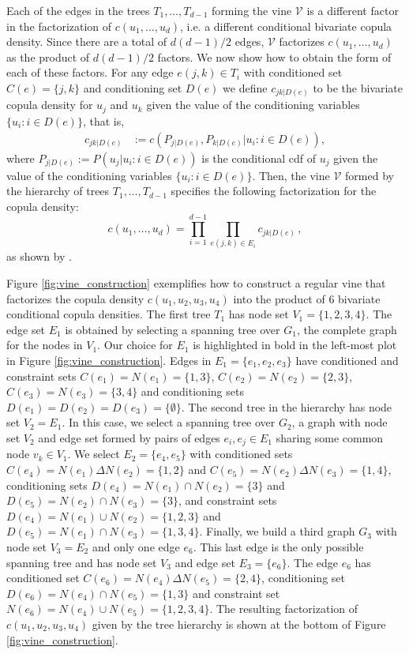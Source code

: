 \documentclass{article}
\begin{document}
Each of the edges in the trees $T_1,\ldots,T_{d-1}$ forming the vine
$\mathcal{V}$ is a different factor in the factorization of
$c(u_1,\ldots,u_d)$, i.e. a different conditional bivariate copula density.
Since there are a total of $d(d-1)/2$ edges, $\mathcal{V}$ factorizes
$c(u_1,\ldots,u_d)$ as the product of $d(d-1)/2$ factors. We now show how to
obtain the form of each of these factors.  For any edge $e(j,k) \in T_i$ with
conditioned set $C(e)=\{j,k\}$ and conditioning set $D(e)$ we define
$c_{jk|D(e)}$ to be the bivariate copula density for $u_j$ and $u_k$ given the
value of the conditioning variables $\{u_i: i \in D(e) \}$, that is,
\begin{align} c_{jk|D(e)} & := c( P_{j|D(e)}, P_{k|D(e)}| u_i : i \in
D(e)),\label{eq:defcjk} \end{align} where $P_{j|D(e)}:=P(u_j|u_i : i \in D(e))$
is the conditional cdf of $u_j$ given the value of the conditioning variables
$\{u_i: i \in D(e) \}$.  Then, the vine $\mathcal{V}$ formed by the hierarchy
of trees $T_1,\ldots,T_{d-1}$ specifies the following factorization for the
copula density:
\begin{equation}
c(u_1, \ldots, u_d) = \prod_{i=1}^{d-1} \prod_{e(j,k) \in E_i}
c_{jk|D(e)}\,,\label{eq:vindeDecomposition}
\end{equation}
as shown by \citet{Kurowicka2006}. 

Figure \ref{fig:vine_construction} exemplifies how to construct a regular vine that
factorizes the copula density $c(u_1, u_2, u_3, u_4)$ into the product of 6
bivariate conditional copula densities.  The first tree $T_1$ has node set $V_1
= \{ 1,2,3,4 \}$.  The edge set $E_1$ is obtained by selecting a spanning tree
over $G_1$, the complete graph for the nodes in $V_1$.  Our choice for $E_1$ is
highlighted in bold in the left-most plot in Figure
\ref{fig:vine_construction}.  Edges in $E_1 = \{ e_1, e_2, e_3
\}$ have conditioned and constraint sets $C(e_1) = N(e_1) = \{ 1, 3 \}$,
$C(e_2) = N(e_2) = \{2,3\}$, $C(e_3) = N(e_3) = \{3,4\}$ and conditioning sets
$D(e_1) = D(e_2) = D(e_3) = \{ \emptyset \}$.  The second tree in the hierarchy
has node set $V_2 = E_1$.  In this case, we select a spanning tree over $G_2$,
a graph with node set $V_2$ and edge set formed by pairs of edges $e_i, e_j \in
E_1$ sharing some common node $v_k \in V_1$.  We select $E_2 = \{ e_4, e_5 \}$
with conditioned sets $C(e_4) = N(e_1) \Delta N(e_2) = \{1,2\}$ and $C(e_5) =
N(e_2) \Delta N(e_3) = \{1,4\}$, conditioning sets $D(e_4) = N(e_1) \cap N(e_2)
= \{ 3 \}$ and $D(e_5) = N(e_2) \cap N(e_3) = \{3\}$, and constraint sets
$D(e_4) = N(e_1) \cup N(e_2) = \{ 1, 2, 3 \}$ and $D(e_5) = N(e_1) \cap N(e_3)
= \{ 1, 3, 4 \}$.  Finally, we build a third graph $G_3$ with node set $V_3 =
E_2$ and only one edge $e_6$. This last edge is the only possible spanning tree
and has node set $V_3$ and edge set $E_3=\{e_6\}$.  The edge $e_6$ has
conditioned set $C(e_6) = N(e_4) \Delta N(e_5) = \{2,4\}$, conditioning set
$D(e_6) = N(e_4) \cap N(e_5) = \{1,3\}$ and constraint set $N(e_6) = N(e_4)
\cup N(e_5) = \{ 1,2,3,4\}$.  The resulting factorization of
$c(u_1,u_2,u_3,u_4)$ given by the tree hierarchy is shown at the bottom of
Figure \ref{fig:vine_construction}.
\end{document}
